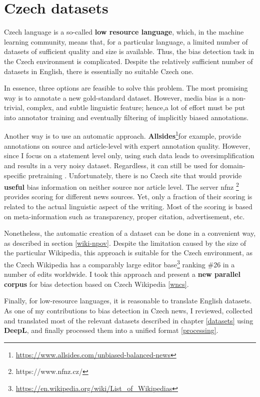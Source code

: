 \chapter{Czech datasets}
Czech language is a so-called \textbf{low resource language}, which, in the machine learning community, means that, for a particular language, a limited number of datasets of sufficient quality and size is available. Thus, the bias detection task in the Czech environment is complicated. Despite the relatively sufficient number of datasets in English, there is essentially no suitable Czech one.

 In essence, three options are feasible to solve this problem. The most promising way is to annotate a new gold-standard dataset. However, media bias is a non-trivial, complex, and subtle linguistic feature; hence,a lot of effort must be put into annotator training and eventually filtering of implicitly biased annotations.
 
 Another way is to use an automatic approach. \textbf{Allsides}\footnote{\url{https://www.allsides.com/unbiased-balanced-news}}for example, provide annotations on source and article-level with expert annotation quality. However, since I focus on a statement level only, using such data leads to oversimplification and results in a very noisy dataset. Regardless, it can still be used for domain-specific pretraining \cite{Spinde2021f}. Unfortunately, there is no Czech site that would provide \textbf{useful} bias information on neither source nor article level. The server \Gls{nfnz} \footnote{https://www.nfnz.cz/} provides scoring for different news sources. Yet, only a fraction of their scoring is related to the actual linguistic aspect of the writing. Most of the scoring is based on meta-information such as transparency, proper citation, advertisement, etc.
 
 Nonetheless, the automatic creation of a dataset can be done in a convenient way, as described in section \ref{wiki-npov}. Despite the limitation caused by the size of the particular Wikipedia, this approach is suitable for the Czech environment, as the Czech Wikipedia has a comparably large editor base\footnote{ \url{https://en.wikipedia.org/wiki/List_of_Wikipedias}} ranking \#26 in a number of edits worldwide. I took this approach and present a \textbf{new parallel corpus} for bias detection based on Czech Wikipedia \ref{wncs}.
 
 Finally, for low-resource languages, it is reasonable to translate English datasets. As one of my contributions to bias detection in Czech news, I reviewed, collected and translated most of the relevant datasets described in chapter \ref{datasets} using \textbf{DeepL}, and finally processed them into a unified format \ref{processing}.
 
